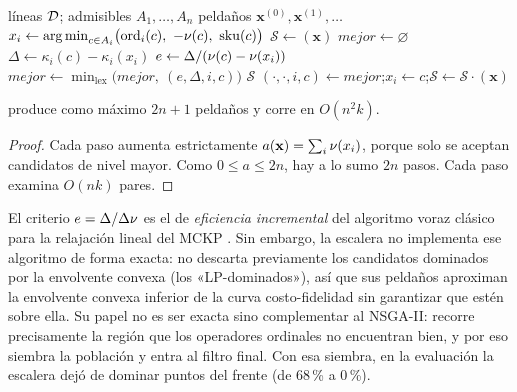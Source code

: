 \begin{algorithm}[htbp]
\caption{Escalera de costo marginal}
\label{alg:escalera}
\begin{algorithmic}[1]
\Require líneas $\mathcal{D}$; admisibles $A_1,\dots,A_n$
\Ensure peldaños $\mathbf{x}^{(0)},\mathbf{x}^{(1)},\dots$
  \State $x_i\gets\operatorname*{arg\,min}_{c\in A_i}\bigl(\mathrm{ord}_i(c),\ -\nu(c),\ \mathrm{sku}(c)\bigr)$ 
\EndFor
\State $\mathcal{S}\gets(\mathbf{x})$
\Loop
  \State $\mathit{mejor}\gets\varnothing$
    \State $\Delta\gets\kappa_i(c)-\kappa_i(x_i)$ 
    \State $e\gets\Delta/(\nu(c)-\nu(x_i))$ 
    \State $\mathit{mejor}\gets\min_{\mathrm{lex}}\bigl(\mathit{mejor},\ (e,\Delta,i,c)\bigr)$
  \EndFor
   \Return $\mathcal{S}$ \EndIf
  \State $(\cdot,\cdot,i,c)\gets\mathit{mejor}$;\quad $x_i\gets c$;\quad $\mathcal{S}\gets\mathcal{S}\cdot(\mathbf{x})$
\EndLoop
\end{algorithmic}
\end{algorithm}

\begin{proposicion}
\label{prop:escalera}
 produce como máximo $2n+1$ peldaños y corre en
$O(n^2k)$.
\end{proposicion}

\begin{proof}
Cada paso aumenta estrictamente $a(\mathbf{x})=\sum_i\nu(x_i)$, porque solo
se aceptan candidatos de nivel mayor. Como $0\leq a\leq2n$, hay a lo sumo $2n$
pasos. Cada paso examina $O(nk)$ pares.
\end{proof}

El criterio $e=\Delta/\Delta\nu$ es el de \emph{eficiencia incremental} del
algoritmo voraz clásico para la relajación lineal del MCKP
\cite{sinha1979mckp}. Sin embargo, la escalera no implementa ese algoritmo de
forma exacta: no descarta previamente los candidatos dominados por la
envolvente convexa (los «LP-dominados»), así que sus peldaños aproximan la
envolvente convexa inferior de la curva costo-fidelidad sin garantizar que
estén sobre ella. Su papel no es ser exacta sino complementar al NSGA-II:
recorre precisamente la región que los operadores ordinales no encuentran
bien, y por eso siembra la población y entra al filtro final. Con esa
siembra, en la evaluación la escalera dejó de dominar puntos del frente
(de 68\,\% a 0\,\%).

